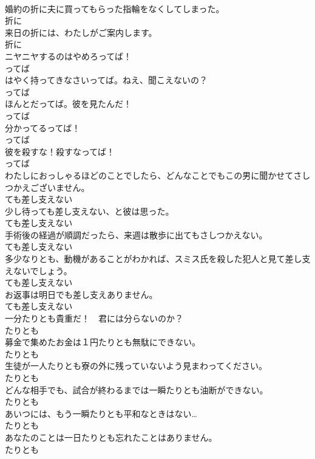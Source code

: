 \documentclass[8pt]{extreport}
\begin{document}
\begin{CJK}{UTF8}{min}
\\	婚約の折に夫に買ってもらった指輪をなくしてしまった。	
\\	折に
\\	来日の折には、わたしがご案内します。	
\\	折に
\\	ニヤニヤするのはやめろってば！	
\\	ってば
\\	はやく持ってきなさいってば。ねえ、聞こえないの？	
\\	ってば
\\	ほんとだってば。彼を見たんだ！	
\\	ってば
\\	分かってるってば！	
\\	ってば
\\	彼を殺すな！殺すなってば！	
\\	ってば
\\	わたしにおっしゃるほどのことでしたら、どんなことでもこの男に聞かせてさしつかえございません。	
\\	ても差し支えない
\\	少し待っても差し支えない、と彼は思った。	
\\	ても差し支えない
\\	手術後の経過が順調だったら、来週は散歩に出てもさしつかえない。	
\\	ても差し支えない
\\	多少なりとも、動機があることがわかれば、スミス氏を殺した犯人と見て差し支えないでしょう。	
\\	ても差し支えない
\\	お返事は明日でも差し支えありません。	
\\	ても差し支えない
\\	一分たりとも貴重だ！　君には分らないのか？	
\\	たりとも
\\	募金で集めたお金は１円たりとも無駄にできない。	
\\	たりとも
\\	生徒が一人たりとも寮の外に残っていないよう見まわってください。	
\\	たりとも
\\	どんな相手でも、試合が終わるまでは一瞬たりとも油断ができない。	
\\	たりとも
\\	あいつには、もう一瞬たりとも平和なときはない…	
\\	たりとも
\\	あなたのことは一日たりとも忘れたことはありません。	
\\	たりとも

\end{CJK}
\end{document}
